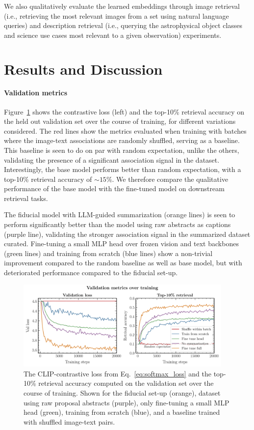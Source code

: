 \documentclass[10pt]{article} %
\begin{document}
We also qualitatively evaluate the learned embeddings through image retrieval (i.e., retrieving the most relevant images from a set using natural language queries) and description retrieval (i.e., querying the astrophysical object classes and science use cases most relevant to a given observation) experiments.

\section{Results and Discussion}
\label{sec:results}

\paragraph*{Validation metrics}

Figure~\ref{fig:retrieval_acc} shows the contrastive loss (left) and the top-10\% retrieval accuracy on the held out validation set over the course of training, for different variations considered. The red lines show the metrics evaluated when training with batches where the image-text associations are randomly shuffled, serving as a baseline. This baseline is seen to do on par with random expectation, unlike the others, validating the presence of a significant association signal in the dataset.
%
Interestingly, the base model performs better than random expectation, with a top-10\% retrieval accuracy of $\sim 15\%$. We therefore compare the qualitative performance of the base model with the fine-tuned model on downstream retrieval tasks.

The fiducial model with LLM-guided summarization (orange lines) is seen to perform significantly better than the model using raw abstracts as captions (purple line), validating the stronger association signal in the summarized dataset curated. Fine-tuning a small MLP head over frozen vision and text backbones (green lines) and training from scratch (blue lines) show a non-trivial improvement compared to the random baseline as well as base model, but with deteriorated performance compared to the fiducial set-up.

\begin{figure}[!h]
  \includegraphics[width=0.95\textwidth]{plots/val_metrics.pdf}
  \caption{The CLIP-contrastive loss from Eq.~\ref{eq:softmax_loss} and the top-10\% retrieval accuracy computed on the validation set over the course of training. Shown for the fiducial set-up (orange), dataset using raw proposal abstracts (purple), only fine-tuning a small MLP head (green), training from scratch (blue), and a baseline trained with shuffled image-text pairs.}
  \label{fig:retrieval_acc}
  \end{figure}
\end{document}
